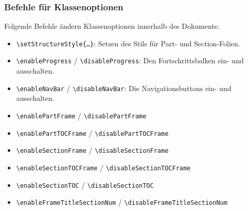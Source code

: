 \documentclass[german,notoc]{tudbeamer}%
\begin{document}
\begin{frame}[fragile]
	\frametitle{Befehle für Klassenoptionen}
	Folgende Befehle ändern Klassenoptionen innerhalb des Dokuments:
	\begin{itemize}
		\item \texttt{\textbackslash setStructureStyle\{\dots\}}: Setzen des Stils für Part- und Section-Folien.
		\item \texttt{\textbackslash enableProgress} / \texttt{\textbackslash disableProgress}: Den Fortschrittsbalken ein- und ausschalten.
		\item \texttt{\textbackslash enableNavBar} / \texttt{\textbackslash disableNavBar}: Die Navigationsbuttons ein- und ausschalten.
		\item \texttt{\textbackslash enablePartFrame} / \texttt{\textbackslash disablePartFrame}
		\item \texttt{\textbackslash enablePartTOCFrame} / \texttt{\textbackslash disablePartTOCFrame}
		\item \texttt{\textbackslash enableSectionFrame} / \texttt{\textbackslash disableSectionFrame}
		\item \texttt{\textbackslash enableSectionTOCFrame} / \texttt{\textbackslash disableSectionTOCFrame}
		\item \texttt{\textbackslash enableSectionTOC} / \texttt{\textbackslash disableSectionTOC}
		\item \texttt{\textbackslash enableFrameTitleSectionNum} / \texttt{\textbackslash disableFrameTitleSectionNum}
	\end{itemize}
\end{frame}
\end{document}
